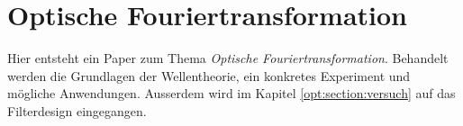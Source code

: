 %
%
%
%
\chapter{Optische Fouriertransformation\label{chapter:opt}}
\begin{refsection}

Hier entsteht ein Paper zum Thema \emph{Optische Fouriertransformation}. Behandelt werden die Grundlagen der
Wellentheorie, ein konkretes Experiment und mögliche Anwendungen. Ausserdem wird im
Kapitel \ref{opt:section:versuch} auf das Filterdesign eingegangen.






\printbibliography[heading=subbibliography]
\end{refsection}
